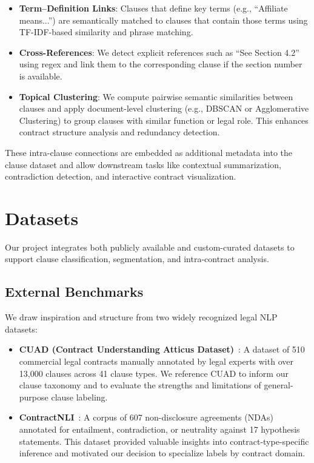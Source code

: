 \documentclass[11pt, oneside]{article}   	%
\begin{document}
\begin{itemize}
    \item \textbf{Term--Definition Links}: Clauses that define key terms (e.g., “Affiliate means...”) are semantically matched to clauses that contain those terms using TF-IDF-based similarity and phrase matching.
    
    \item \textbf{Cross-References}: We detect explicit references such as “See Section 4.2” using regex and link them to the corresponding clause if the section number is available.
    
    \item \textbf{Topical Clustering}: We compute pairwise semantic similarities between clauses and apply document-level clustering (e.g., DBSCAN or Agglomerative Clustering) to group clauses with similar function or legal role. This enhances contract structure analysis and redundancy detection.
\end{itemize}

These intra-clause connections are embedded as additional metadata into the clause dataset and allow downstream tasks like contextual summarization, contradiction detection, and interactive contract visualization.


\section*{Datasets}

Our project integrates both publicly available and custom-curated datasets to support clause classification, segmentation, and intra-contract analysis.

\subsection*{External Benchmarks}

We draw inspiration and structure from two widely recognized legal NLP datasets:

\begin{itemize}
    \item \textbf{CUAD (Contract Understanding Atticus Dataset)}~\cite{hendrycks2021cuad}: A dataset of 510 commercial legal contracts manually annotated by legal experts with over 13,000 clauses across 41 clause types. We reference CUAD to inform our clause taxonomy and to evaluate the strengths and limitations of general-purpose clause labeling.
    
    \item \textbf{ContractNLI}~\cite{koreeda2021contractnli}: A corpus of 607 non-disclosure agreements (NDAs) annotated for entailment, contradiction, or neutrality against 17 hypothesis statements. This dataset provided valuable insights into contract-type-specific inference and motivated our decision to specialize labels by contract domain.
\end{itemize}
\end{document}
